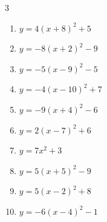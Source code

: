 


\setcounter{quesnum}{57}

\begin{multicols}{3}
\begin{enumerate}
  \itemsep=1pt
  \item $\displaystyle y=4\left( x+8\right)^{2}+5$

        \phantom{$\displaystyle 頂点\left( -8 , 5 \right)$}

  \item $\displaystyle y=-8\left( x+2\right)^{2}-9$

        \phantom{$\displaystyle 頂点\left( -2 , -9 \right)$}

  \item $\displaystyle y=-5\left( x-9\right)^{2}-5$

        \phantom{$\displaystyle 頂点\left( 9 , -5 \right)$}

  \item $\displaystyle y=-4\left( x-10\right)^{2}+7$

        \phantom{$\displaystyle 頂点\left( 10 , 7 \right)$}

  \item $\displaystyle y=-9\left( x+4\right)^{2}-6$

        \phantom{$\displaystyle 頂点\left( -4 , -6 \right)$}

  \item $\displaystyle y=2\left( x-7\right)^{2}+6$

        \phantom{$\displaystyle 頂点\left( 7 , 6 \right)$}

  \item $\displaystyle y=7x^{2}+3$

        \phantom{$\displaystyle 頂点\left( 0 , 3 \right)$}

  \item $\displaystyle y=5\left( x+5\right)^{2}-9$

        \phantom{$\displaystyle 頂点\left( -5 , -9 \right)$}

  \item $\displaystyle y=5\left( x-2\right)^{2}+8$

        \phantom{$\displaystyle 頂点\left( 2 , 8 \right)$}

  \item $\displaystyle y=-6\left( x-4\right)^{2}-1$

        \phantom{$\displaystyle 頂点\left( 4 , -1 \right)$}


\end{enumerate}
\end{multicols}
